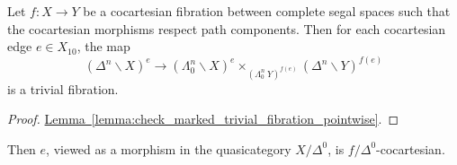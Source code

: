 \documentclass[main.tex]{subfiles}
\begin{document}
\begin{corollary}
  \label{cor:pointwise_left_horn_condition}
  Let $f\colon X \to Y$ be a cocartesian fibration between complete segal spaces such that the cocartesian morphisms respect path components. Then for each cocartesian edge $e \in X_{10}$, the map
  \begin{equation*}
    (\Delta^{n} \backslash X)^{e} \to (\Lambda^{n}_{0} \backslash X)^{e} \times_{(\Lambda^{n}_{0} \ Y)^{f(e)}} (\Delta^{n} \backslash Y)^{f(e)}
  \end{equation*}
  is a trivial fibration.
\end{corollary}
\begin{proof}
  \hyperref[lemma:check_marked_trivial_fibration_pointwise]{Lemma~\ref*{lemma:check_marked_trivial_fibration_pointwise}}.
\end{proof}

Then $e$, viewed as a morphism in the quasicategory $X / \Delta^{0}$, is $f / \Delta^{0}$-cocartesian.
\end{document}
